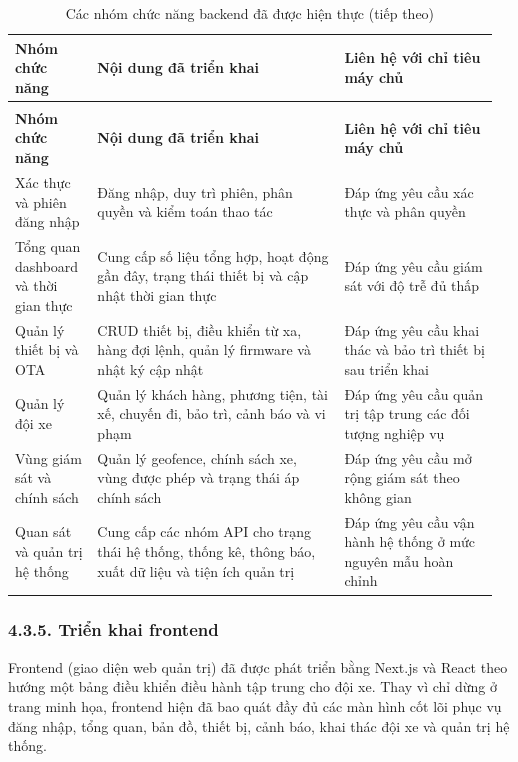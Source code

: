 \documentclass[a4paper]{extarticle}
\newcommand{\thesissettableid}[2]{%
  \renewcommand{\thetable}{#1}%
  \renewcommand{\theHtable}{#2}%
}
\begin{document}
{\thesissettableid{4.11}{condensed-bang-4-11-cac-nhom-chuc-nang-backend-da-duoc-hien-thuc}
\def\LTcaptype{table}
\begin{longtable}{|L{0.166\linewidth}|L{0.485\linewidth}|L{0.307\linewidth}|}
\caption{Các nhóm chức năng backend đã được hiện thực}\label{tab:condensed-bang-4-11-cac-nhom-chuc-nang-backend-da-duoc-hien-thuc}\\
\hline
\textbf{Nhóm chức năng} & \textbf{Nội dung đã triển khai} & \textbf{Liên hệ với chỉ tiêu máy chủ} \\
\hline
\endfirsthead
\caption[]{Các nhóm chức năng backend đã được hiện thực (tiếp theo)}\\
\hline
\textbf{Nhóm chức năng} & \textbf{Nội dung đã triển khai} & \textbf{Liên hệ với chỉ tiêu máy chủ} \\
\hline
\endhead
\endfoot
\endlastfoot
Xác thực và phiên đăng nhập & Đăng nhập, duy trì phiên, phân quyền và kiểm toán thao tác & Đáp ứng yêu cầu xác thực và phân quyền \\\hline
Tổng quan dashboard và thời gian thực & Cung cấp số liệu tổng hợp, hoạt động gần đây, trạng thái thiết bị và cập nhật thời gian thực & Đáp ứng yêu cầu giám sát với độ trễ đủ thấp \\\hline
Quản lý thiết bị và OTA & CRUD thiết bị, điều khiển từ xa, hàng đợi lệnh, quản lý firmware và nhật ký cập nhật & Đáp ứng yêu cầu khai thác và bảo trì thiết bị sau triển khai \\\hline
Quản lý đội xe & Quản lý khách hàng, phương tiện, tài xế, chuyến đi, bảo trì, cảnh báo và vi phạm & Đáp ứng yêu cầu quản trị tập trung các đối tượng nghiệp vụ \\\hline
Vùng giám sát và chính sách & Quản lý geofence, chính sách xe, vùng được phép và trạng thái áp chính sách & Đáp ứng yêu cầu mở rộng giám sát theo không gian \\\hline
Quan sát và quản trị hệ thống & Cung cấp các nhóm API cho trạng thái hệ thống, thống kê, thông báo, xuất dữ liệu và tiện ích quản trị & Đáp ứng yêu cầu vận hành hệ thống ở mức nguyên mẫu hoàn chỉnh \\\hline
\end{longtable}
}

\subsubsection{4.3.5. Triển khai frontend}\label{triux1ec3n-khai-frontend}

Frontend (giao diện web quản trị) đã được phát triển bằng Next.js và React theo
hướng một bảng điều khiển điều hành tập trung cho đội xe. Thay vì chỉ dừng ở trang minh
họa, frontend hiện đã bao quát đầy đủ các màn hình cốt lõi phục vụ đăng nhập, tổng
quan, bản đồ, thiết bị, cảnh báo, khai thác đội xe và quản trị hệ thống.
\end{document}
